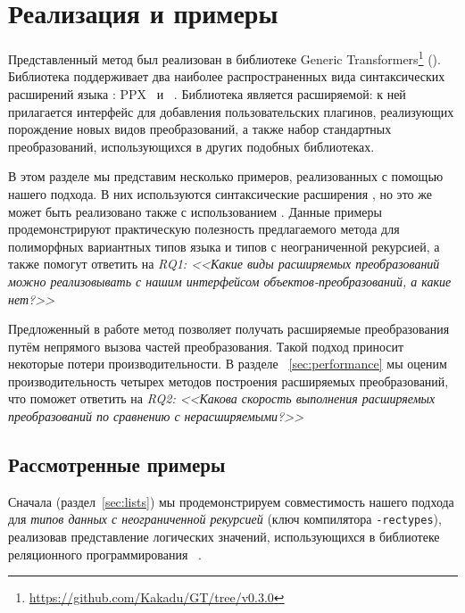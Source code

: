 \section{Реализация и примеры}
\label{sec:Evaluation}

Представленный метод был реализован в библиотеке Generic Transformers\footnote{\url{https://github.com/Kakadu/GT/tree/v0.3.0}} (\GT). Библиотека  поддерживает два наиболее распространенных вида синтаксических расширений языка \ocaml{}: \textsc{PPX}~\cite{PPXLib} и \camlpfive~\cite{camlp5}. Библиотека \GT{} является расширяемой: к ней прилагается интерфейс для добавления пользовательских плагинов, реализующих порождение новых видов преобразований, а также набор стандартных преобразований, использующихся в других подобных библиотеках.


В этом разделе мы представим несколько примеров, реализованных с помощью нашего подхода. В них используются синтаксические расширения \camlpfive{}, но это же может быть реализовано также с использованием \PPX{}. Данные примеры продемонстрируют практическую полезность предлагаемого метода для полиморфных вариантных типов языка \OCaml{} и типов с неограниченной рекурсией, а также  помогут ответить на \emph{RQ1: <<Какие виды расширяемых преобразований можно реализовывать с нашим интерфейсом объектов-преобразований, а какие нет?>>}


Предложенный в работе метод позволяет получать расширяемые преобразования путём непрямого вызова частей преобразования. Такой подход приносит некоторые потери производительности. В разделе ~\ref{sec:performance} мы оценим производительность четырех методов построения расширяемых преобразований, что поможет ответить на 
\emph{RQ2: <<Какова скорость выполнения расширяемых преобразований по сравнению с нерасширяемыми?>>}

\subsection{Рассмотренные примеры}

Сначала (раздел~\ref{sec:lists}) мы продемонстрируем совместимость 
нашего подхода для \emph{типов данных с неограниченной рекурсией}
(ключ компилятора \texttt{-rectypes}), 
реализовав
представление логических значений, использующихся в  библиотеке реляционного программирования \OCanren{}~\cite{OCanren}. %

